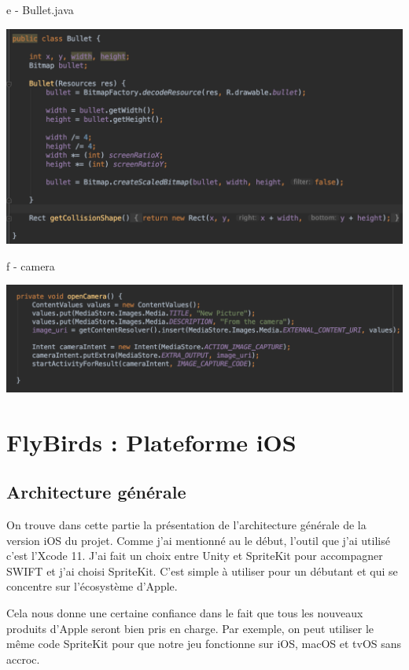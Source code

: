 \documentclass{rapportECL}
\begin{document}
e - Bullet.java

\begin{center}
    \includegraphics[scale = 0.5]{logos/Bullet.png}
\end{center}
f - camera

\begin{center}
    \includegraphics[scale = 0.5]{logos/camera.png}
\end{center}


\section{FlyBirds : Plateforme iOS}
\subsection{Architecture générale}
On trouve dans cette partie la présentation de l'architecture générale de la version iOS du projet. Comme j'ai mentionné au le début, l'outil que j'ai utilisé c'est l'Xcode\cite{xCode} 11. J'ai fait un choix entre Unity et SpriteKit\cite{Spritekit} pour accompagner SWIFT et j'ai choisi SpriteKit. C'est simple à utiliser pour un débutant et qui se concentre sur l'écosystème d'Apple.


Cela nous donne une certaine confiance dans le fait que tous les nouveaux produits d'Apple seront bien pris en charge. Par exemple, on peut utiliser le même code SpriteKit\cite{Spritekit} pour que notre jeu fonctionne sur iOS, macOS et tvOS sans accroc.\newline
\end{document}
